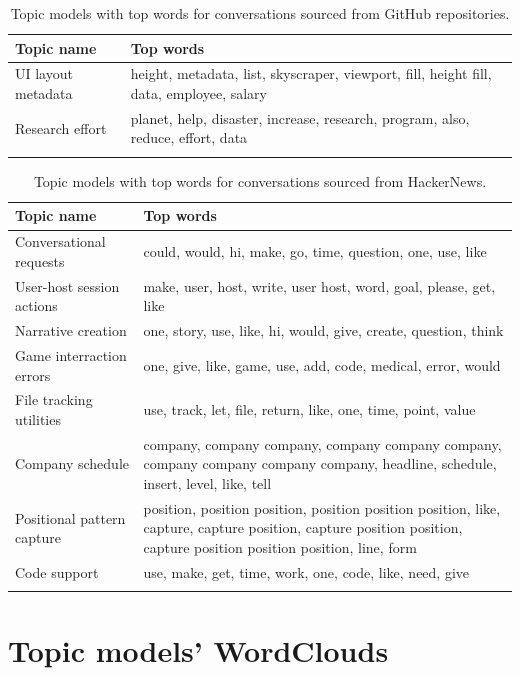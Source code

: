 \begin{longtable}{|m{4cm}|m{8cm}|}
    \hline
    \textbf{Topic name} & \textbf{Top words}  \\
    \hline
    \hline
        UI layout metadata & height, metadata, list, skyscraper, viewport, fill, height fill, data, employee, salary \\
    \hline
        Research effort & planet, help, disaster, increase, research, program, also, reduce, effort, data \\
    \hline
\caption{Topic models with top words for conversations sourced from GitHub repositories.}
\label{table:repository-topics}
\end{longtable}


\begin{longtable}{|m{4cm}|m{8cm}|}
    \hline
    \textbf{Topic name} & \textbf{Top words}  \\
    \hline
    \hline
        Conversational requests & could, would, hi, make, go, time, question, one, use, like \\
    \hline
        User-host session actions & make, user, host, write, user host, word, goal, please, get, like \\
    \hline
        Narrative creation & one, story, use, like, hi, would, give, create, question, think \\
    \hline
        Game interraction errors & one, give, like, game, use, add, code, medical, error, would \\
    \hline
        File tracking utilities & use, track, let, file, return, like, one, time, point, value \\
    \hline
        Company schedule & company, company company, company company company, company company company company, headline, schedule, insert, level, like, tell \\
    \hline
        Positional pattern capture & position, position position, position position position, like, capture, capture position, capture position position, capture position position position, line, form \\
    \hline
        Code support & use, make, get, time, work, one, code, like, need, give \\
    \hline
\caption{Topic models with top words for conversations sourced from HackerNews.}
\label{table:hn-topics}
\end{longtable}

\pagebreak
\section{Topic models' WordClouds}\label{appendix:topic-models-wordclouds}

